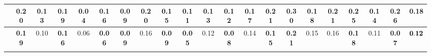 \begin{table}[ht]
{\begin{tabular}{cccccccc|cccc|cccccccc|c}
  \rowcolor[HTML]{FFFFFF}
  \multicolumn{1}{c}{\cellcolor[HTML]{FFFFFF}SVGD} &
  0.20 & %
  0.13 & %
  0.19 & %
  0.04 & %
  0.16 & %
  0.09 & %
  0.20 & %
  0.15 & %
  0.11 & %
  0.13 & %
  0.12 & %
  0.17 & %
  0.21 & %
  0.30 & %
  0.18 & %
  0.21 & %
  0.25 & %
  0.14 & %
  0.26 & %
  \cellcolor[HTML]{FFFFFF}0.18 \\ \hline
\rowcolor[HTML]{FFFFFF} 
\multicolumn{1}{c}{\textbf{FHBI}} &
  \cellcolor[HTML]{9AFF99}\textbf{0.19} & %
  0.10 & %
  \cellcolor[HTML]{9AFF99}\textbf{0.16} & %
  0.06 & %
  \cellcolor[HTML]{9AFF99}\textbf{0.06} & %
  \cellcolor[HTML]{9AFF99}\textbf{0.09} & %
  0.16 & %
  \cellcolor[HTML]{9AFF99}\textbf{0.09} & %
  \cellcolor[HTML]{9AFF99}\textbf{0.05} & %
   0.12 & %
  \cellcolor[HTML]{9AFF99}\textbf{0.08} & %
   0.14& %
  \cellcolor[HTML]{9AFF99}\textbf{0.15} & %
  \cellcolor[HTML]{9AFF99}\textbf{0.21} & %
  0.15 & %
   0.16 & %
   \cellcolor[HTML]{9AFF99}\textbf{0.18 }& %
   0.11 & %
   \cellcolor[HTML]{9AFF99}\textbf{0.07}& %
  \cellcolor[HTML]{9AFF99}$\bf{0.12}$ \\ \hline
  \label{table: ece}
\end{tabular}
}
\end{table}
